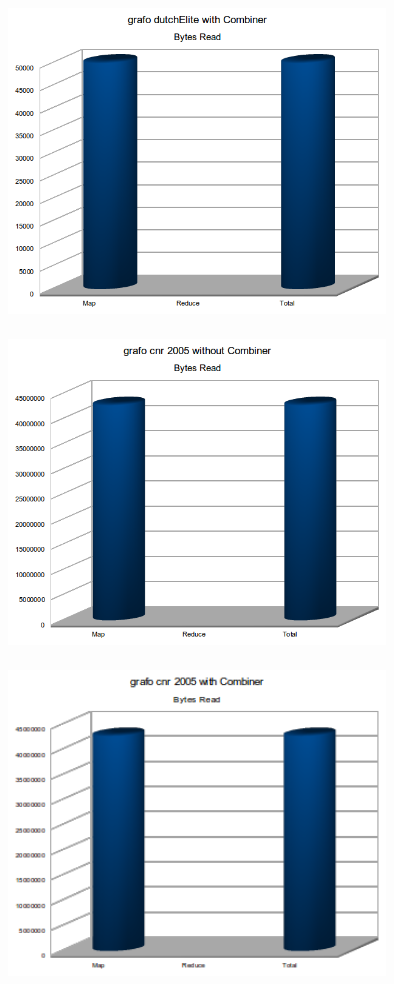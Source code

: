 \documentclass[a4paper,11pt]{report}
\begin{document}
\paragraph{}
\centerline{\includegraphics[width=100mm]{images/grafici/decombBR.png}}
\paragraph{}
\centerline{\includegraphics[width=100mm]{images/grafici/cnrBR.png}}
\paragraph{}
\centerline{\includegraphics[width=100mm]{images/grafici/cnr_combBR.png}}
\end{document}
